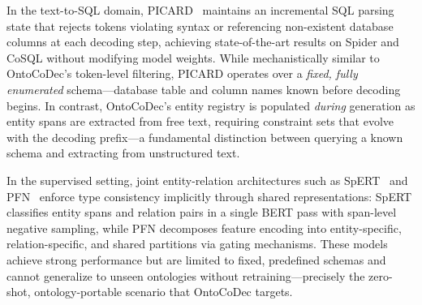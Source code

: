 


In the text-to-SQL domain, PICARD~\cite{scholak2021picard} maintains an incremental SQL parsing state that rejects tokens violating syntax or referencing non-existent database columns at each decoding step, achieving state-of-the-art results on Spider and CoSQL without modifying model weights.
While mechanistically similar to OntoCoDec's token-level filtering, PICARD operates over a \emph{fixed, fully enumerated} schema---database table and column names known before decoding begins.
In contrast, OntoCoDec's entity registry is populated \emph{during} generation as entity spans are extracted from free text, requiring constraint sets that evolve with the decoding prefix---a fundamental distinction between querying a known schema and extracting from unstructured text.



In the supervised setting, joint entity-relation architectures such as SpERT~\cite{eberts2020spert} and PFN~\cite{yan2021pfn} enforce type consistency implicitly through shared representations: SpERT classifies entity spans and relation pairs in a single BERT pass with span-level negative sampling, while PFN decomposes feature encoding into entity-specific, relation-specific, and shared partitions via gating mechanisms.
These models achieve strong performance but are limited to fixed, predefined schemas and cannot generalize to unseen ontologies without retraining---precisely the zero-shot, ontology-portable scenario that OntoCoDec targets.


